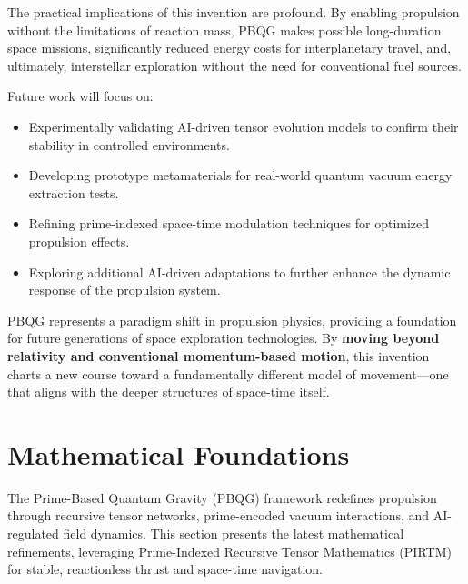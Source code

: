 \documentclass{article}
\theoremstyle{plain}
\begin{document}
The practical implications of this invention are profound. By enabling propulsion without the limitations of reaction mass, PBQG makes possible long-duration space missions, significantly reduced energy costs for interplanetary travel, and, ultimately, interstellar exploration without the need for conventional fuel sources. 

Future work will focus on:
\begin{itemize}
    \item Experimentally validating AI-driven tensor evolution models to confirm their stability in controlled environments.
    \item Developing prototype metamaterials for real-world quantum vacuum energy extraction tests.
    \item Refining prime-indexed space-time modulation techniques for optimized propulsion effects.
    \item Exploring additional AI-driven adaptations to further enhance the dynamic response of the propulsion system.
\end{itemize}

PBQG represents a paradigm shift in propulsion physics, providing a foundation for future generations of space exploration technologies. By \textbf{moving beyond relativity and conventional momentum-based motion}, this invention charts a new course toward a fundamentally different model of movement—one that aligns with the deeper structures of space-time itself.

\section{Mathematical Foundations}
The Prime-Based Quantum Gravity (PBQG) framework redefines propulsion through recursive tensor networks, prime-encoded vacuum interactions, and AI-regulated field dynamics. This section presents the latest mathematical refinements, leveraging Prime-Indexed Recursive Tensor Mathematics (PIRTM) for stable, reactionless thrust and space-time navigation.
\end{document}
